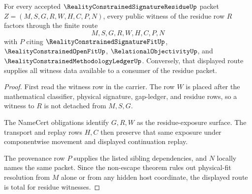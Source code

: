 \begin{theorem}
\label{thm:reality-constrained-signature-residue-witness-route-totality}
For every accepted $\RealityConstrainedSignatureResidueUp$ packet $Z=(M,S,G,R,W,H,C,P,N)$, every public witness of the residue row $R$ factors through the finite route
$$
M,S,G,R,W,H,C,P,N
$$
with $P$ citing $\RealityConstrainedSignatureFitUp$, $\RealityConstrainedOpenFitUp$, $\RelationalObjectivityUp$, and $\RealityConstrainedMethodologyLedgerUp$. Conversely, that displayed route supplies all witness data available to a consumer of the residue packet.
\end{theorem}
\begin{proof}
First read the witness row in the carrier. The row $W$ is placed after the mathematical classifier, physical signature, gap-ledger, and residue rows, so a witness to $R$ is not detached from $M,S,G$.

The NameCert obligations identify $G,R,W$ as the residue-exposure surface. The transport and replay rows $H,C$ then preserve that same exposure under componentwise movement and displayed continuation replay.

The provenance row $P$ supplies the listed sibling dependencies, and $N$ locally names the same packet. Since the non-escape theorem rules out physical-fit resolution from $M$ alone or from any hidden host coordinate, the displayed route is total for residue witnesses.
\end{proof}

